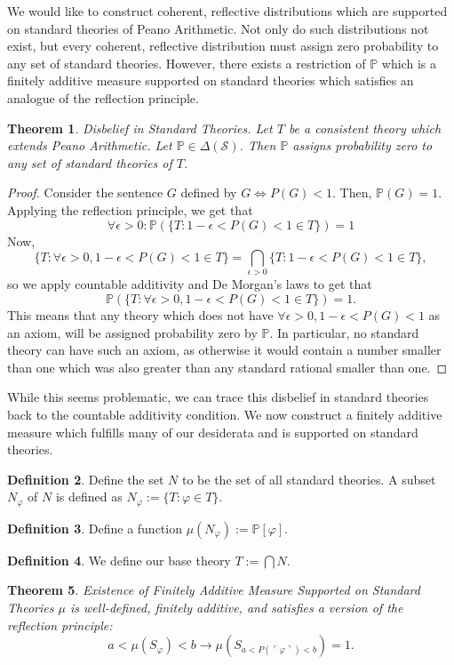 \documentclass[12pt]{article}
\newcommand{\PP}{\mathbb{P}}
\newcommand{\vp}{\varphi}
\theoremstyle{plain}
\newtheorem{theorem}{Theorem}[subsection]
\theoremstyle{definition}
\newtheorem{definition}[theorem]{Definition}
\theoremstyle{remark}
\begin{document}
We would like to construct coherent, reflective distributions which are supported on standard theories of Peano Arithmetic.
Not only do such distributions not exist, but every coherent, reflective distribution must assign zero probability to any set of standard theories. 
However, there exists a restriction of $\PP$ which is a finitely additive measure supported on standard theories which satisfies an analogue of the reflection principle.
\begin{theorem} \emph{Disbelief in Standard Theories.}
Let $T$ be a consistent theory which extends Peano Arithmetic.
Let $\PP\in\Delta(\mathcal{S})$.
Then $\PP$ assigns probability zero to any set of standard theories of $T$.
\end{theorem}
\begin{proof}
Consider the sentence $G$ defined by $G \iff P(G) < 1$.
Then, $\PP(G)=1$.
Applying the reflection principle, we get that 
$$\forall\epsilon>0: \PP(\{T:1-\epsilon<P(G)<1\in T\})=1$$
Now, 
$$\{T:\forall \epsilon>0,1-\epsilon<P(G)<1\in T\}=\bigcap_{\epsilon>0}\{T:1-\epsilon<P(G)<1\in T\},$$ so we apply countable additivity and De Morgan's laws to get that $$\PP(\{T:\forall \epsilon>0,1-\epsilon<P(G)<1\in T\})=1.$$
This means that any theory which does not have $\forall \epsilon>0,1-\epsilon<P(G)<1$ as an axiom, will be assigned probability zero by $\PP$.
In particular, no standard theory can have such an axiom, as otherwise it would contain a number smaller than one which was also greater than any standard rational smaller than one.
\end{proof}
While this seems problematic, we can trace this disbelief in standard theories back to the countable additivity condition. We now construct a finitely additive measure which fulfills many of our desiderata and is supported on standard theories.
\begin{definition}
Define the set $N$ to be the set of all standard theories. A subset $N_{\vp}$ of $N$ is defined as $N_{\vp}:=\{T:\vp\in T\}$.
\end{definition}
\begin{definition}
Define a function $\mu(N_{\vp}):=\PP[\vp]$.
\end{definition}
\begin{definition}
We define our base theory $T:=\bigcap N$.
\end{definition}
\begin{theorem} \emph{Existence of Finitely Additive Measure Supported on Standard Theories}
$\mu$ is well-defined, finitely additive, and satisfies a version of the reflection principle:
$$a < \mu(S_{\vp}) < b \rightarrow \mu(S_{a < P(\ulcorner \vp \urcorner) < b}) = 1.$$
\end{theorem}
\end{document}

